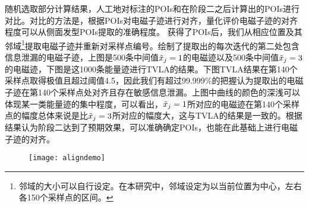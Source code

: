 {	%
	
	随机选取部分计算结果，人工地对标注的POIs和在阶段二之后计算出的POIs进行对比。对比的方法是，根据POIs对电磁子迹进行对齐，量化评价电磁子迹的对齐程度可以从侧面发型POIs提取的准确程度。
	获得了POIs后，我们从相应位置及其邻域\footnote{邻域的大小可以自行设定。在本研究中，邻域设定为以当前位置为中心，左右各150个采样点的区间。}提取电磁子迹并重新对采样点编号。绘制了提取出的每次迭代的第二处包含信息泄漏的电磁子迹，上图是500条中间值$\tilde{x}_j=1$的电磁迹以及500条中间值$\tilde{x}_j=3$的电磁迹，下图是这1000条能量迹进行TVLA的结果。下图TVLA结果在第140个采样点取得极值且超过阈值4.5，因此我们有超过99.999\%的把握认为提取出的电磁子迹在第140个采样点处对齐且存在敏感信息泄漏。上图中曲线的颜色的深浅可以体现某一类能量迹的集中程度，可以看出，$\tilde{x}_j=1$所对应的电磁迹在第140个采样点的幅度总体来说是比$\tilde{x}_j=3$所对应的幅度大，这与TVLA的结果是一致的。根据结果认为阶段二达到了预期效果，可以准确确定POIs，也能在此基础上进行电磁子迹的对齐。
	
	\begin{figure}[!h]
		\begin{center}
			\texttt{[image: aligndemo]}
			\label{fig:aligndemo}
		\end{center}
	\end{figure}

}
